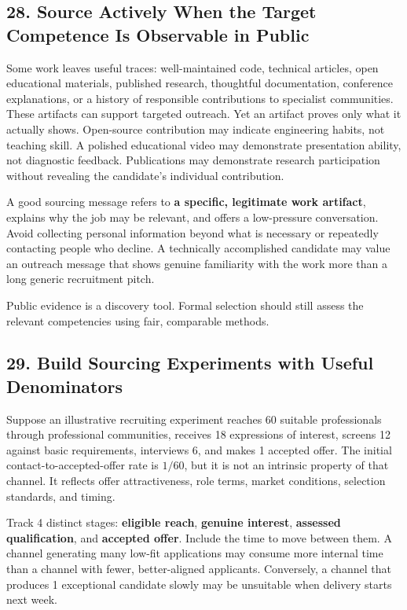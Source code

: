 \subsection*{28. Source Actively When the Target Competence Is Observable in Public}

Some work leaves useful traces: well-maintained code, technical articles, open educational materials, published research, thoughtful documentation, conference explanations, or a history of responsible contributions to specialist communities. These artifacts can support targeted outreach. Yet an artifact proves only what it actually shows. Open-source contribution may indicate engineering habits, not teaching skill. A polished educational video may demonstrate presentation ability, not diagnostic feedback. Publications may demonstrate research participation without revealing the candidate's individual contribution.

A good sourcing message refers to \textbf{a specific, legitimate work artifact}, explains why the job may be relevant, and offers a low-pressure conversation. Avoid collecting personal information beyond what is necessary or repeatedly contacting people who decline. A technically accomplished candidate may value an outreach message that shows genuine familiarity with the work more than a long generic recruitment pitch.

Public evidence is a discovery tool. Formal selection should still assess the relevant competencies using fair, comparable methods.

\subsection*{29. Build Sourcing Experiments with Useful Denominators}

Suppose an illustrative recruiting experiment reaches 60 suitable professionals through professional communities, receives 18 expressions of interest, screens 12 against basic requirements, interviews 6, and makes 1 accepted offer. The initial contact-to-accepted-offer rate is $1/60$, but it is not an intrinsic property of that channel. It reflects offer attractiveness, role terms, market conditions, selection standards, and timing.

Track 4 distinct stages: \textbf{eligible reach}, \textbf{genuine interest}, \textbf{assessed qualification}, and \textbf{accepted offer}. Include the time to move between them. A channel generating many low-fit applications may consume more internal time than a channel with fewer, better-aligned applicants. Conversely, a channel that produces 1 exceptional candidate slowly may be unsuitable when delivery starts next week.

